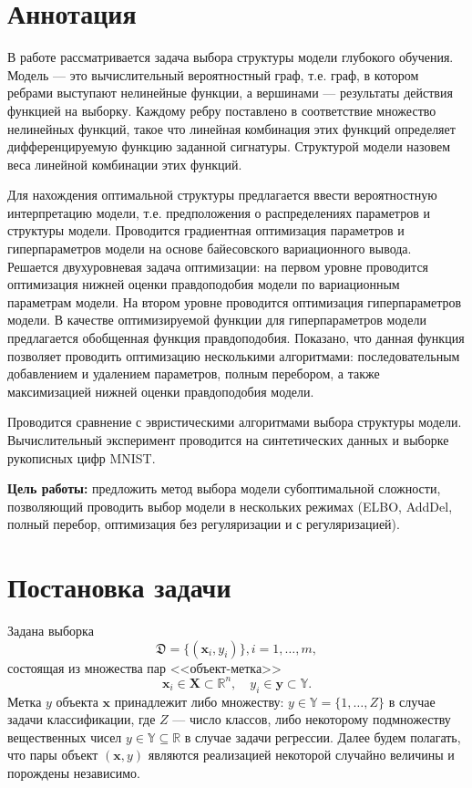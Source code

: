 \documentclass[12pt]{article}
\begin{document}
\section{Аннотация}
В работе рассматривается задача выбора структуры модели глубокого обучения.
Модель --- это вычислительный вероятностный граф, т.е. граф, в котором ребрами выступают нелинейные функции, а вершинами --- результаты действия функцией на выборку.  Каждому ребру поставлено в соответствие множество нелинейных функций, такое что линейная комбинация этих функций определяет дифференцируемую функцию заданной сигнатуры. Структурой модели назовем веса линейной комбинации этих функций. 

Для нахождения оптимальной структуры предлагается ввести вероятностную интерпретацию модели, т.е. предположения о распределениях параметров и структуры модели. 
Проводится градиентная оптимизация параметров и гиперпараметров модели на основе байесовского вариационного вывода. Решается двухуровневая задача оптимизации: на первом уровне проводится оптимизация нижней оценки правдоподобия модели по вариационным параметрам модели. На втором уровне проводится оптимизация гиперпараметров модели. В качестве оптимизируемой функции для гиперпараметров модели предлагается обобщенная функция правдоподобия. Показано, что данная функция позволяет проводить оптимизацию  несколькими алгоритмами: последовательным добавлением и удалением параметров, полным перебором, а также максимизацией нижней оценки правдоподобия модели.

Проводится сравнение с эвристическими алгоритмами выбора структуры модели. Вычислительный эксперимент проводится на синтетических данных и выборке рукописных цифр MNIST.

\textbf{Цель работы:} предложить метод выбора модели субоптимальной сложности, позволяющий проводить выбор модели в нескольких режимах (ELBO, AddDel, полный перебор, оптимизация без регуляризации и с регуляризацией).



\section{Постановка задачи}
Задана выборка \begin{equation}\label{eq:dataset}\mathfrak{D} = \{(\mathbf{x}_i,y_i)\}, i = 1,\dots,m,\end{equation} состоящая из множества пар <<объект-метка>> $$\mathbf{x}_i \in \mathbf{X} \subset \mathbb{R}^n, \quad {y}_i \in \mathbf{y} \subset \mathbb{Y}.$$ Метка ${y}$  объекта $\mathbf{x}$ принадлежит либо множеству: ${y} \in \mathbb{Y} = \{1, \dots, Z\}$ в случае задачи классификации, где $Z$ --- число классов, либо некоторому подмножеству вещественных чисел ${y} \in \mathbb{Y}  \subseteq \mathbb{R}$ в случае задачи регрессии. Далее будем полагать, что пары объект $(\mathbf{x}, y)$ являются реализацией некоторой случайно величины и порождены независимо.
\end{document}
